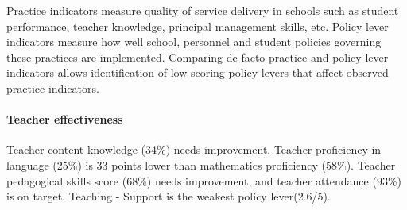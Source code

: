 \documentclass[
  twocolumn]{article}
\begin{document}
Practice indicators measure quality of service delivery in schools such
as student performance, teacher knowledge, principal management skills,
etc. Policy lever indicators measure how well school, personnel and
student policies governing these practices are implemented. Comparing
de-facto practice and policy lever indicators allows identification of
low-scoring policy levers that affect observed practice indicators.

\hypertarget{teacher-effectiveness}{%
\paragraph{\texorpdfstring{\textbf{Teacher
effectiveness}}{Teacher effectiveness}}\label{teacher-effectiveness}}

Teacher content knowledge (34\%) needs improvement. Teacher proficiency
in language (25\%) is 33 points lower than mathematics proficiency
(58\%). Teacher pedagogical skills score (68\%) needs improvement, and
teacher attendance (93\%) is on target. Teaching - Support is the
weakest policy lever(2.6/5).
\end{document}
